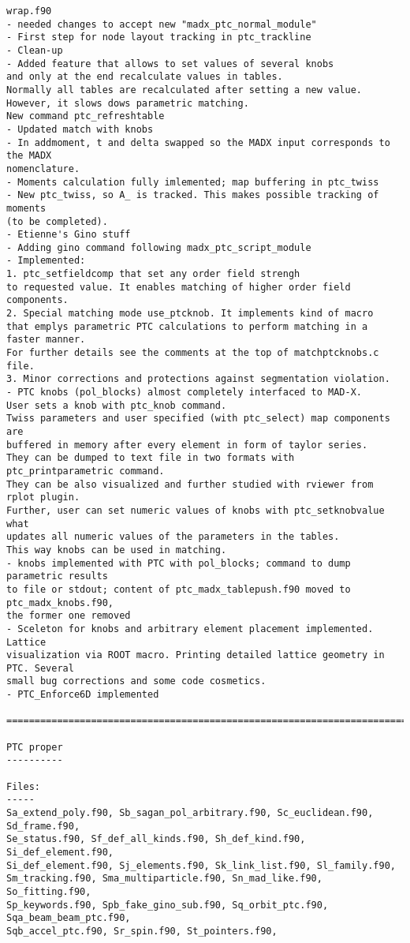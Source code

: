 \begin{verbatim}
wrap.f90
- needed changes to accept new "madx_ptc_normal_module"
- First step for node layout tracking in ptc_trackline
- Clean-up
- Added feature that allows to set values of several knobs
and only at the end recalculate values in tables.
Normally all tables are recalculated after setting a new value.
However, it slows dows parametric matching.
New command ptc_refreshtable
- Updated match with knobs
- In addmoment, t and delta swapped so the MADX input corresponds to the MADX 
nomenclature.
- Moments calculation fully imlemented; map buffering in ptc_twiss
- New ptc_twiss, so A_ is tracked. This makes possible tracking of moments 
(to be completed).
- Etienne's Gino stuff
- Adding gino command following madx_ptc_script_module
- Implemented:
1. ptc_setfieldcomp that set any order field strengh
to requested value. It enables matching of higher order field components.
2. Special matching mode use_ptcknob. It implements kind of macro
that emplys parametric PTC calculations to perform matching in a faster manner.
For further details see the comments at the top of matchptcknobs.c file.
3. Minor corrections and protections against segmentation violation.
- PTC knobs (pol_blocks) almost completely interfaced to MAD-X.
User sets a knob with ptc_knob command.
Twiss parameters and user specified (with ptc_select) map components are
buffered in memory after every element in form of taylor series.
They can be dumped to text file in two formats with ptc_printparametric command.
They can be also visualized and further studied with rviewer from rplot plugin.
Further, user can set numeric values of knobs with ptc_setknobvalue what
updates all numeric values of the parameters in the tables.
This way knobs can be used in matching.
- knobs implemented with PTC with pol_blocks; command to dump parametric results 
to file or stdout; content of ptc_madx_tablepush.f90 moved to ptc_madx_knobs.f90, 
the former one removed
- Sceleton for knobs and arbitrary element placement implemented. Lattice 
visualization via ROOT macro. Printing detailed lattice geometry in PTC. Several 
small bug corrections and some code cosmetics.
- PTC_Enforce6D implemented

=============================================================================

PTC proper
----------

Files:
-----
Sa_extend_poly.f90, Sb_sagan_pol_arbitrary.f90, Sc_euclidean.f90, Sd_frame.f90,
Se_status.f90, Sf_def_all_kinds.f90, Sh_def_kind.f90, Si_def_element.f90,
Si_def_element.f90, Sj_elements.f90, Sk_link_list.f90, Sl_family.f90,
Sm_tracking.f90, Sma_multiparticle.f90, Sn_mad_like.f90, So_fitting.f90,
Sp_keywords.f90, Spb_fake_gino_sub.f90, Sq_orbit_ptc.f90, Sqa_beam_beam_ptc.f90,
Sqb_accel_ptc.f90, Sr_spin.f90, St_pointers.f90, 


\end{verbatim}
